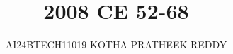 \documentclass[journal]{IEEEtran}
\begin{document}

\vspace{3cm}

\title{2008 CE 52-68}
\author{AI24BTECH11019-KOTHA PRATHEEK REDDY}

 \maketitle
{\let\newpage\relax\maketitle}

\renewcommand{\thefigure}{\theenumi}
\renewcommand{\thetable}{\theenumi}
\setlength{\intextsep}{10pt} %


\renewcommand{\thetable}{\theenumi}
\end{document}
